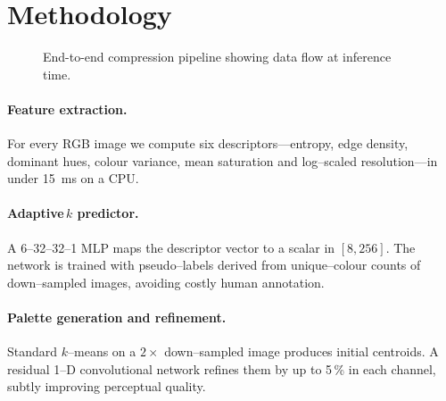 \documentclass{../manuscript/Electrical new template/elektr}
\begin{document}
\section{Methodology}
\begin{figure}[!ht]
    \centering
    \caption{End-to-end compression pipeline showing data flow at inference time.}
    \label{fig:pipeline}
\end{figure}

\paragraph{Feature extraction.}  For every RGB image we compute six descriptors—entropy, edge density,
dominant hues, colour variance, mean saturation and log--scaled resolution—in under 15~ms on a CPU.

\paragraph{Adaptive\,\(k\) predictor.}  A 6--32--32--1 MLP maps the descriptor vector to a scalar in
\([8,256]\).  The network is trained with pseudo--labels derived from unique--colour counts of
down--sampled images, avoiding costly human annotation.

\paragraph{Palette generation and refinement.}  Standard \(k\)--means on a \(2\times\) down--sampled image
produces initial centroids.  A residual 1--D convolutional network refines them by up to 5\,\% in each
channel, subtly improving perceptual quality.
\end{document}
